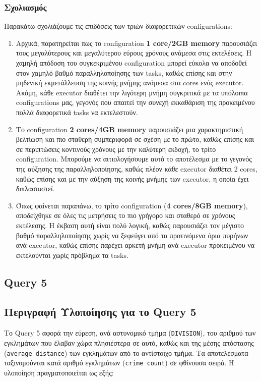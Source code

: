 \documentclass{article}
\begin{document}
\subsubsection*{ Σχολιασμός }
Παρακάτω σχολιάζουμε τις επιδόσεις των τριών διαφορετικών configurations:
\begin{enumerate}
	\item Αρχικά, παρατηρείται πως το configuration \textbf{1 core/2GB memory} παρουσιάζει τους μεγαλύτερους και μεγαλύτερου εύρους χρόνους ανάμεσα στις εκτελέσεις. Η χαμηλή απόδοση του συγκεκριμένου configuration μπορεί εύκολα να αποδοθεί στον χαμηλό βαθμό παραλληλοποίησης των tasks, καθώς επίσης και στην μηδενική εκμετάλλευση της κοινής μνήμης ανάμεσα στα cores ενός executor. Ακόμη, κάθε executor διαθέτει την λιγότερη μνήμη συγκριτικά με τα υπόλοιπα configurations μας, γεγονός που απαιτεί την συνεχή εκκαθάριση της προκειμένου πολλά διαφορετικά tasks να εκτελεστούν. 
	\item Το configuration \textbf{2 cores/4GB memory} παρουσιάζει μια χαρακτηριστική βελτίωση και πιο σταθερή συμπεριφορά σε σχέση με το πρώτο, καθώς επίσης και σε περιπτώσεις κοντινούς χρόνους με την καλύτερη εκδοχή, το τρίτο configuration. Μπορούμε να αιτιολογήσουμε αυτό το αποτέλεσμα με το γεγονός της αύξησης της παραλληλοποίησης, καθώς πλέον κάθε executor διαθέτει 2 cores, καθώς επίσης και με την αύξηση της κοινής μνήμης των executor, η οποία έχει διπλασιαστεί.  
	\item Όπως φαίνεται παραπάνω, το τρίτο configuration (\textbf{4 cores/8GB memory}), αποδείχθηκε σε όλες τις μετρήσεις το πιο γρήγορο και σταθερό σε χρόνους εκτέλεσης. Η έκβαση αυτή είναι πολύ λογική, καθώς παρουσιάζει τον μέγιστο βαθμό παραλληλοποίησης χωρίς να ξεφεύγει από τα προτινόμενα όρια πυρήνων ανά executor, καθώς επίσης παρέχει αρκετή μνήμη ανά executor προκειμένου να εκτελούνται χωρίς πρόβλημα τα tasks.  
\end{enumerate}

\newpage
\subsection {Query 5}
\subsection*{Περιγραφή Υλοποίησης για το Query 5}

Το Query 5 αφορά την εύρεση, ανά αστυνομικό τμήμα (\texttt{DIVISION}), του αριθμού των εγκλημάτων που έλαβαν χώρα πλησιέστερα σε αυτό, καθώς και της μέσης απόστασης (\texttt{average distance}) των εγκλημάτων από το αντίστοιχο τμήμα. Τα αποτελέσματα ταξινομούνται κατά αριθμό εγκλημάτων (\texttt{crime count}) σε φθίνουσα σειρά. Η υλοποίηση πραγματοποιείται ως εξής:
\end{document}
